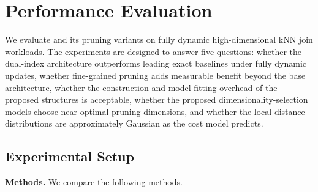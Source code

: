 \section{Performance Evaluation}\label{sec:exp}

We evaluate \dualtree and its pruning variants on fully dynamic high-dimensional kNN join workloads. The experiments are designed to answer five questions: whether the dual-index architecture outperforms leading exact baselines under fully dynamic updates, whether fine-grained pruning adds measurable benefit beyond the base architecture, whether the construction and model-fitting overhead of the proposed structures is acceptable, whether the proposed dimensionality-selection models choose near-optimal pruning dimensions, and whether the local distance distributions are approximately Gaussian as the cost model predicts.

\subsection{Experimental Setup}

\noindent\textbf{Methods.}
We compare the following methods.

